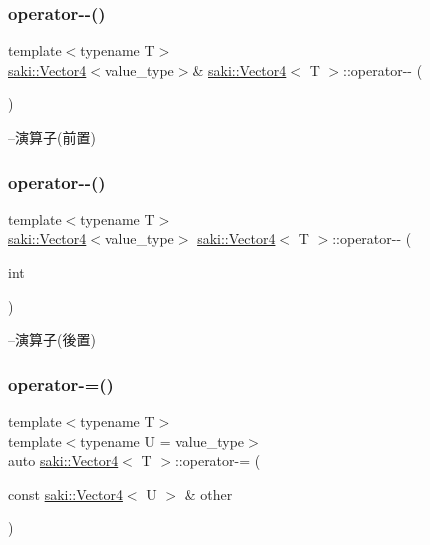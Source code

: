 \subsubsection{\texorpdfstring{operator-\/-\/()}{operator--()}\hspace{0.1cm}{\footnotesize\ttfamily [1/2]}}
{\footnotesize\ttfamily template$<$typename T$>$ \\
\mbox{\hyperlink{classsaki_1_1_vector4}{saki\+::\+Vector4}}$<$value\+\_\+type$>$\& \mbox{\hyperlink{classsaki_1_1_vector4}{saki\+::\+Vector4}}$<$ T $>$\+::operator-\/-\/ (\begin{DoxyParamCaption}{ }\end{DoxyParamCaption})\hspace{0.3cm}{\ttfamily [inline]}}



--演算子(前置) 

\mbox{\label{classsaki_1_1_vector4_ad1c11380a18df412290242271587c1fa}} 
\subsubsection{\texorpdfstring{operator-\/-\/()}{operator--()}\hspace{0.1cm}{\footnotesize\ttfamily [2/2]}}
{\footnotesize\ttfamily template$<$typename T$>$ \\
\mbox{\hyperlink{classsaki_1_1_vector4}{saki\+::\+Vector4}}$<$value\+\_\+type$>$ \mbox{\hyperlink{classsaki_1_1_vector4}{saki\+::\+Vector4}}$<$ T $>$\+::operator-\/-\/ (\begin{DoxyParamCaption}\item[{int}]{ }\end{DoxyParamCaption})\hspace{0.3cm}{\ttfamily [inline]}}



--演算子(後置) 

\mbox{\label{classsaki_1_1_vector4_aa8473ee1b9c23057f80bb31ce5b7641e}} 
\subsubsection{\texorpdfstring{operator-\/=()}{operator-=()}}
{\footnotesize\ttfamily template$<$typename T$>$ \\
template$<$typename U  = value\+\_\+type$>$ \\
auto \mbox{\hyperlink{classsaki_1_1_vector4}{saki\+::\+Vector4}}$<$ T $>$\+::operator-\/= (\begin{DoxyParamCaption}\item[{const \mbox{\hyperlink{classsaki_1_1_vector4}{saki\+::\+Vector4}}$<$ U $>$ \&}]{other }\end{DoxyParamCaption})\hspace{0.3cm}{\ttfamily [inline]}}



